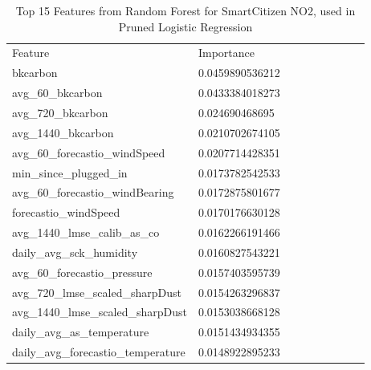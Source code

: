 \begin{table}[H]
\centering
\begin{tabular}{lllllllll}
\\
\\
\toprule
Feature & Importance \\
\midrule

bkcarbon & 0.0459890536212 \\
avg\_60\_bkcarbon & 0.0433384018273 \\
avg\_720\_bkcarbon & 0.024690468695 \\
avg\_1440\_bkcarbon & 0.0210702674105 \\
avg\_60\_forecastio\_windSpeed & 0.0207714428351 \\
min\_since\_plugged\_in & 0.0173782542533 \\
avg\_60\_forecastio\_windBearing & 0.0172875801677 \\
forecastio\_windSpeed & 0.0170176630128 \\
avg\_1440\_lmse\_calib\_as\_co & 0.0162266191466 \\
daily\_avg\_sck\_humidity & 0.0160827543221 \\
avg\_60\_forecastio\_pressure & 0.0157403595739 \\
avg\_720\_lmse\_scaled\_sharpDust & 0.0154263296837 \\
avg\_1440\_lmse\_scaled\_sharpDust & 0.0153038668128 \\
daily\_avg\_as\_temperature & 0.0151434934355 \\
daily\_avg\_forecastio\_temperature & 0.0148922895233 \\
\bottomrule
\end{tabular}
\label{tab:sck_no2_randomforest_features}
\caption{Top 15 Features from Random Forest for SmartCitizen NO2, used in Pruned Logistic Regression}
\end{table}


